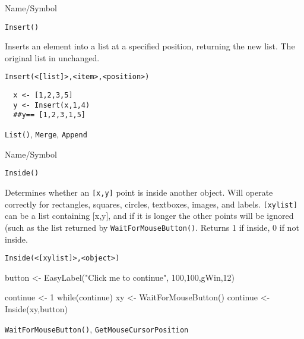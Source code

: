 \begin{desc}{Name/Symbol}
\item[Name/Symbol]	\verb+Insert()+

\item[Description] Inserts an element into a list at a specified
  position, returning the new list. The original list in unchanged.

\item[Usage]	
\begin{verbatim}
Insert(<[list]>,<item>,<position>)	
\end{verbatim}
\item[Example]	

\begin{verbatim}
  x <- [1,2,3,5]
  y <- Insert(x,1,4)  
  ##y== [1,2,3,1,5]  
\end{verbatim}

\item[See Also]	
\verb+List()+, \verb+Merge+, \verb+Append+

\end{desc}

\begin{desc}{Name/Symbol}
\item[Name/Symbol]	\verb+Inside()+

\item[Description] Determines whether an \verb+[x,y]+ point is inside another
  object.  Will operate correctly for rectangles, squares, circles,
  textboxes, images, and labels. \verb+[xylist]+ can be a list containing
  [x,y], and if it is longer the other points will be ignored (such as
  the list returned by \verb+WaitForMouseButton()+.  Returns 1 if inside, 0
  if not inside.

\item[Usage]
\begin{verbatim}
Inside(<[xylist]>,<object>)	
\end{verbatim}

\item[Example]	


      button <- EasyLabel("Click me to continue", 100,100,gWin,12)

      continue <- 1
      while(continue)
      {
         xy <- WaitForMouseButton()
         continue <- Inside(xy,button)
      }
     

\item[See Also]	
\verb+WaitForMouseButton()+, \verb+GetMouseCursorPosition+

\end{desc}

